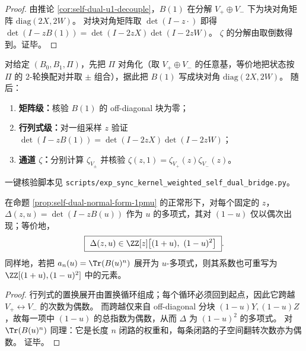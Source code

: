 \begin{proof}
由推论 \ref{cor:self-dual-u1-decouple}，\(B(1)\) 在分解 \(V_+\oplus V_-\) 下为块对角矩阵 \(\mathrm{diag}(2X,2W)\)。
对块对角矩阵取 \(\det(I-z\cdot)\) 即得
\(
\det(I-zB(1))=\det(I-2zX)\det(I-2zW)
\)。
\(\zeta\) 的分解由取倒数得到。证毕。
\end{proof}

\begin{remark}\label{rem:sync-kernel-u1-two-channel-bridge}
对给定 \((B_0,B_1,\Pi)\)，先把 \(\Pi\) 对角化（取 \(V_+\oplus V_-\) 的任意基，等价地把状态按 \(\Pi\) 的 \(2\)-轮换配对并取 \(\pm\) 组合），据此把 \(B(1)\) 写成块对角 \(\mathrm{diag}(2X,2W)\)。
随后：
\begin{enumerate}
  \item \textbf{矩阵级：}核验 \(B(1)\) 的 off-diagonal 块为零；
  \item \textbf{行列式级：}对一组采样 \(z\) 验证 \(\det(I-zB(1))=\det(I-2zX)\det(I-2zW)\)；
  \item \textbf{通道 \(\zeta\)：}分别计算 \(\zeta_{V_\pm}\) 并核验 \(\zeta(z,1)=\zeta_{V_+}(z)\zeta_{V_-}(z)\)。
\end{enumerate}
一键核验脚本见 \texttt{scripts/exp\_sync\_kernel\_weighted\_self\_dual\_bridge.py}。
\end{remark}

\begin{corollary}\label{cor:self-dual-delta-even-in-1mu}
在命题 \ref{prop:self-dual-normal-form-1pmu} 的正常形下，对每个固定的 \(z\)，
\(\Delta(z,u)=\det(I-zB(u))\)
作为 \(u\) 的多项式，其对 \((1-u)\) 仅以偶次出现；等价地，
\[
\boxed{\ \Delta(z,u)\in \ZZ[z]\bigl[(1+u),\ (1-u)^2\bigr]\ }.
\]
同样地，若把 \(a_n(u)=\Tr(B(u)^n)\) 展开为 \(u\)-多项式，则其系数也可重写为 \(\ZZ[(1+u),(1-u)^2]\) 中的元素。
\end{corollary}
\begin{proof}
行列式的置换展开由置换循环组成；每个循环必须回到起点，因此它跨越 \(V_+\leftrightarrow V_-\) 的次数为偶数。
而跨越仅来自 off-diagonal 分块 \((1-u)Y,(1-u)Z\)，故每一项中 \((1-u)\) 的总指数为偶数，从而 \(\Delta\) 为 \((1-u)^2\) 的多项式。
对 \(\Tr(B(u)^n)\) 同理：它是长度 \(n\) 闭路的权重和，每条闭路的子空间翻转次数亦为偶数。
证毕。
\end{proof}

